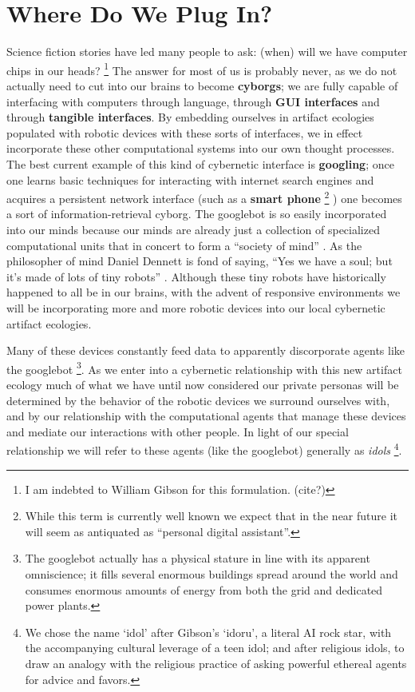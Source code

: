 \section{Where Do We Plug In?}
%
Science fiction stories have led many people to ask: (when) will we have computer chips in our heads?%
\footnote{I am indebted to William Gibson for this formulation. (cite?)} 
The answer for most of us is probably never, as we do not actually need to cut into our brains to become \textbf{cyborgs}; we are fully capable of interfacing with computers through language, through \textbf{GUI interfaces} and through \textbf{tangible interfaces}.
By embedding ourselves in artifact ecologies populated with robotic devices with these sorts of interfaces, we in effect incorporate these other computational systems into our own thought processes.
The best current example of this kind of cybernetic interface is \textbf{googling}; once one learns basic techniques for interacting with internet search engines and acquires a persistent network interface (such as a \textbf{smart phone}%
\footnote{While this term is currently well known we expect that in the near future it will seem as antiquated as ``personal digital assistant''.}
) one becomes a sort of information-retrieval cyborg.
The googlebot is so easily incorporated into our minds because our minds are already just a collection of specialized computational units that in concert to form a ``society of mind'' \citep{society_of_mind}. 
As the philosopher of mind Daniel Dennett is fond of saying, ``Yes we have a soul; but it's made of lots of tiny robots'' \citeyearpar[][p. 1]{freedom_evolves}. Although these tiny robots have historically happened to all be in our brains, with the advent of responsive environments we will be incorporating more and more robotic devices into our local cybernetic artifact ecologies.

Many of these devices constantly feed data to apparently discorporate agents like the googlebot%
\footnote{The googlebot actually has a physical stature in line with its apparent omniscience; it fills several enormous buildings spread around the world and consumes enormous amounts of energy from both the grid and dedicated power plants.}.
As we enter into a cybernetic relationship with this new artifact ecology much of what we have until now considered our private personas will be determined by the behavior of the robotic devices we surround ourselves with, and by our relationship with the computational agents that manage these devices and mediate our interactions with other people. 
In light of our special relationship we will refer to these agents (like the googlebot) generally as \emph{idols}%
\footnote{We chose the name `idol' after Gibson's `idoru'\citeyearpar{gibson_idoru}, a literal AI rock star, with the accompanying cultural leverage of a teen idol; and after religious idols, to draw an analogy with the religious practice of asking powerful ethereal agents for advice and favors.}.

